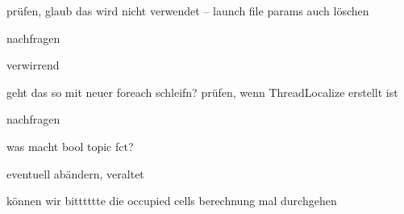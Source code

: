 \begin{DoxyRefList}
prüfen, glaub das wird nicht verwendet -- launch file params auch löschen  
\item[\label{todo__todo000010}%
\hypertarget{todo__todo000010}{}%
Member \hyperlink{classohm__tsd__slam__ref_1_1SlamNode_a5b4ee64a1d3b1ead996762adfc95ad94}{ohm\-\_\-tsd\-\_\-slam\-\_\-ref\-:\-:Slam\-Node\-:\-:call\-Back\-Service\-Start\-Stop\-S\-L\-A\-M} (ohm\-\_\-tsd\-\_\-slam\-\_\-ref\-::\-Start\-Stop\-S\-L\-A\-M\-::\-Request \&req, ohm\-\_\-tsd\-\_\-slam\-\_\-ref\-::\-Start\-Stop\-S\-L\-A\-M\-::\-Response \&res)]nachfragen  
\item[\label{todo__todo000001}%
\hypertarget{todo__todo000001}{}%
Member \hyperlink{classohm__tsd__slam__ref_1_1SlamNode_af35bd7adca13df47579a682ab3bb827d}{ohm\-\_\-tsd\-\_\-slam\-\_\-ref\-:\-:Slam\-Node\-:\-:Slam\-Node} (void)]verwirrend  
\item[\label{todo__todo000002}%
\hypertarget{todo__todo000002}{}%
Member \hyperlink{classohm__tsd__slam__ref_1_1SlamNode_a0dbbdf08b6ac75aba94c882715d7f49e}{ohm\-\_\-tsd\-\_\-slam\-\_\-ref\-:\-:Slam\-Node\-:\-:$\sim$\-Slam\-Node} ()]geht das so mit neuer foreach schleifn? prüfen, wenn Thread\-Localize erstellt ist  
\item[\label{todo__todo000008}%
\hypertarget{todo__todo000008}{}%
Class \hyperlink{structohm__tsd__slam__ref_1_1TaggedSubscriber}{ohm\-\_\-tsd\-\_\-slam\-\_\-ref\-:\-:Tagged\-Subscriber} ]nachfragen  
\item[\label{todo__todo000009}%
\hypertarget{todo__todo000009}{}%
Member \hyperlink{structohm__tsd__slam__ref_1_1TaggedSubscriber_a6d4ad13158333a16725cdc1cdd6ab3c2}{ohm\-\_\-tsd\-\_\-slam\-\_\-ref\-:\-:Tagged\-Subscriber\-:\-:topic} (const std\-::string topic)]was macht bool topic fct?  
\item[\label{todo__todo000018}%
\hypertarget{todo__todo000018}{}%
Member \hyperlink{classohm__tsd__slam__ref_1_1ThreadGrid_a3e1350e3d4943ab408ae9b0935300972}{ohm\-\_\-tsd\-\_\-slam\-\_\-ref\-:\-:Thread\-Grid\-:\-:\-\_\-occ\-Grid\-Content} ]eventuell abändern, veraltet  
\item[\label{todo__todo000017}%
\hypertarget{todo__todo000017}{}%
Member \hyperlink{classohm__tsd__slam__ref_1_1ThreadGrid_ab5153ffea8c253924f5d5f1f05d9aa59}{ohm\-\_\-tsd\-\_\-slam\-\_\-ref\-:\-:Thread\-Grid\-:\-:event\-Loop} (void)]können wir bitttttte die occupied cells berechnung mal durchgehen 


\end{DoxyRefList}
